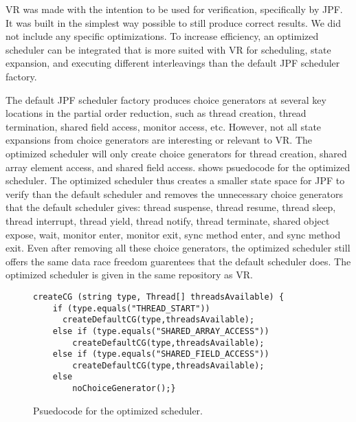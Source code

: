 VR was made with the intention to be used for verification, specifically by JPF. It was built in the simplest way possible to still produce correct results. We did not include any specific optimizations. To increase efficiency, an optimized scheduler can be integrated that is more suited with VR for scheduling, state expansion, and executing different interleavings than the default JPF scheduler factory.

The default JPF scheduler factory produces choice generators at several key locations in the partial order reduction, such as thread creation, thread termination, shared field access, monitor access, etc. However, not all state expansions from choice generators are interesting or relevant to VR. The optimized scheduler will only create choice generators for thread creation, shared array element access, and shared field access.  shows  psuedocode for the optimized scheduler. The optimized scheduler thus creates a smaller state space for JPF to verify than the default scheduler and removes the unnecessary choice generators that the default scheduler gives: thread suspense, thread resume, thread sleep, thread interrupt, thread yield, thread notify, thread terminate, shared object expose, wait, monitor enter, monitor exit, sync method enter, and sync method exit. Even after removing all these choice generators, the optimized scheduler still offers the same data race freedom guarentees that the default scheduler does. The optimized scheduler is given in the same repository as VR.

\begin{figure}
\begin{center}
{\small
\begin{verbatim}
createCG (string type, Thread[] threadsAvailable) {
    if (type.equals("THREAD_START"))
      createDefaultCG(type,threadsAvailable);
    else if (type.equals("SHARED_ARRAY_ACCESS"))
        createDefaultCG(type,threadsAvailable);
    else if (type.equals("SHARED_FIELD_ACCESS"))
        createDefaultCG(type,threadsAvailable);
    else
        noChoiceGenerator();}
\end{verbatim}
}
\end{center}
\caption{Psuedocode for the optimized scheduler.}
\label{fig:pseudocode}
\end{figure}



